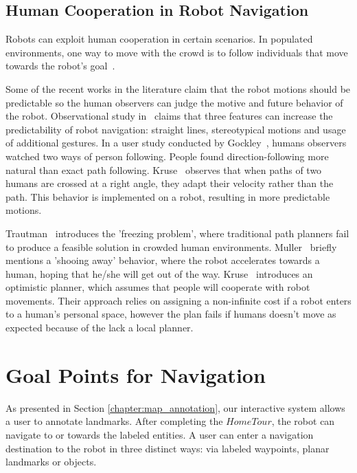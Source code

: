 \subsection{Human Cooperation in Robot Navigation}

Robots can exploit human cooperation in certain scenarios. In populated environments, one way to move with the crowd is to follow individuals that move towards the robot's goal~\cite{stein2012robot,muller2008socially}. 

Some of the recent works in the literature claim that the robot motions should be predictable so the human observers can judge the motive and future behavior of the robot. Observational study in~\cite{lichtenthaler2013towards} claims that three features can increase the predictability of robot navigation: straight lines, stereotypical motions and usage of additional gestures. In a user study conducted by Gockley~\cite{gockley2007natural}, humans observers watched two ways of person following. People found direction-following more natural than exact path following. Kruse~\cite{kruse2012legible} observes that when paths of two humans are crossed at a right angle, they adapt their velocity rather than the path. This behavior is implemented on a robot, resulting in more predictable motions. 

Trautman~\cite{trautman2010unfreezing} introduces the 'freezing problem', where traditional path planners fail to produce a feasible solution in crowded human environments. Muller~\cite{muller2008socially} briefly mentions a 'shooing away' behavior, where the robot accelerates towards a human, hoping that he/she will get out of the way. Kruse~\cite{kruse2010exploiting} introduces an optimistic planner, which assumes that people will cooperate with robot movements. Their approach relies on assigning a non-infinite cost if a robot enters to a human's personal space, however the plan fails if humans doesn't move as expected because of the lack a local planner.


\section{Goal Points for Navigation}
\label{sec:navigation_finding_goal_points_for_navigation}

As presented in Section \ref{chapter:map_annotation}, our interactive system allows a user to annotate landmarks. After completing the $Home Tour$, the robot can navigate to or towards the labeled entities.
A user can enter a navigation destination to the robot in three distinct ways: via labeled waypoints, planar landmarks or objects.

